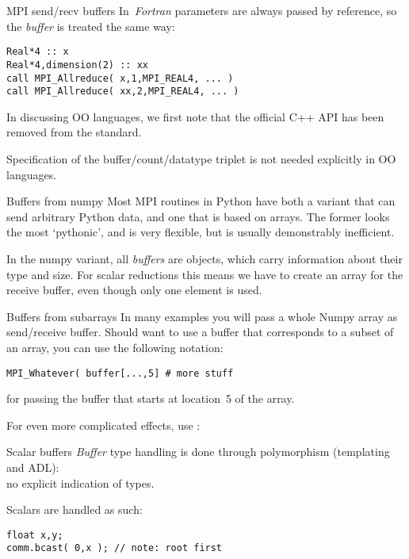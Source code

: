 \begin{fortrannote}{MPI send/recv buffers}
  In~\emph{Fortran} parameters are always passed by reference,
  so the \emph{buffer}
  is treated the same way:
\begin{lstlisting}
Real*4 :: x
Real*4,dimension(2) :: xx
call MPI_Allreduce( x,1,MPI_REAL4, ... )
call MPI_Allreduce( xx,2,MPI_REAL4, ... )
\end{lstlisting}
\end{fortrannote}

In discussing \ac{OO} languages, we first note that
the official C++ \ac{API} has been removed from the standard.

Specification of the buffer/count/datatype triplet is not
needed explicitly in \ac{OO} languages.

\begin{pythonnote}{Buffers from numpy}
  Most MPI routines in Python have both a variant that can send arbitrary Python data,
  and one that is based on  arrays.
  The former looks the most `pythonic', and is very flexible,
  but is usually demonstrably inefficient.

  In the numpy variant, all \emph{buffers}
  are  objects, which carry information about their type and size.
  For scalar reductions this means we have to create an array for the receive buffer,
  even though only one element is used.
\end{pythonnote}

\begin{pythonnote}{Buffers from subarrays}
  In many examples you will pass a whole Numpy array as send/receive buffer.
  Should want to use a buffer that corresponds to a subset of an array,
  you can use the following notation:
\begin{lstlisting}
MPI_Whatever( buffer[...,5] # more stuff    
\end{lstlisting}
for passing the buffer that starts at location~5 of the array.

For even more complicated effects, use :

\end{pythonnote}

\begin{mplnote}{Scalar buffers}
  \label{mpl:buf-scalar}
  \emph{Buffer} type handling
  is done through polymorphism (templating and ADL): \\
  no explicit indication of types.

  Scalars are handled as such:
\begin{lstlisting}
float x,y;
comm.bcast( 0,x ); // note: root first
\end{lstlisting}
\end{mplnote}

